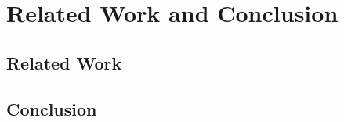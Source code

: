 \chapter{Related Work and Conclusion}
\label{sec:related-work-conclusion}

\section{Related Work}
\label{sec:related-work}

\section{Conclusion}
\label{sec:conclusion}
